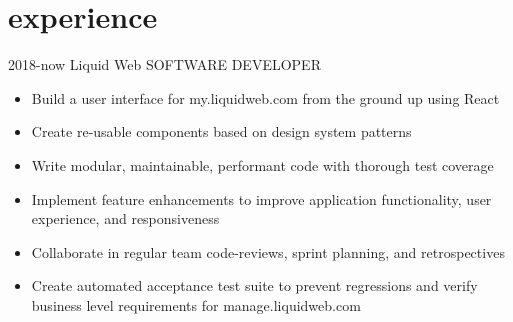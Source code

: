 \documentclass[]{friggeri-cv}
\begin{document}
\section{experience}

\begin{entrylist}

\entry
  {2018-now}
  {\textcolor{gray}{\FA \faTint} Liquid Web}
  {SOFTWARE DEVELOPER}
  {
    \textit{}
    \begin{itemize}[topsep=2pt,leftmargin=0pt,itemsep=6pt]
      \item Build a user interface for my.liquidweb.com from the ground up using React
      \item Create re-usable components based on design system patterns
      \item Write modular, maintainable, performant code with thorough test coverage
      \item Implement feature enhancements to improve application functionality, user experience, and responsiveness
      \item Collaborate in regular team code-reviews, sprint planning, and retrospectives
      \item Create automated acceptance test suite to prevent regressions and verify business level requirements for manage.liquidweb.com
    \end{itemize}
    
}
\end{entrylist}
\end{document}
